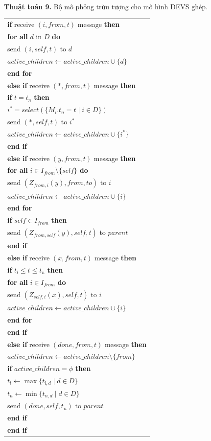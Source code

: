 \noindent\textbf{Thuật toán 9.} Bộ mô phỏng trừu tượng cho mô hình DEVS ghép.
{\small
\begin{longtable}{@{}l@{}}
\textbf{if} receive $(i,from,t)$ message \textbf{then}\\
\quad\textbf{for all} $d$ in $D$ \textbf{do}\\
\qquad send $(i,self,t)$ to $d$\\
\qquad $active\_children\leftarrow active\_children\cup\{d\}$\\
\quad\textbf{end for}\\
\textbf{else if} receive $(*,from,t)$ message \textbf{then}\\
\quad\textbf{if} $t=t_n$ \textbf{then}\\
\qquad $i^*=select(\{M_i.t_n=t\mid i\in D\})$\\
\qquad send $(*,self,t)$ to $i^*$\\
\qquad $active\_children\leftarrow active\_children\cup\{i^*\}$\\
\quad\textbf{end if}\\
\textbf{else if} receive $(y,from,t)$ message \textbf{then}\\
\quad\textbf{for all} $i\in I_{from}\setminus\{self\}$ \textbf{do}\\
\qquad send $(Z_{from,i}(y),from,to)$ to $i$\\
\qquad $active\_children\leftarrow active\_children\cup\{i\}$\\
\quad\textbf{end for}\\
\quad\textbf{if} $self\in I_{from}$ \textbf{then}\\
\qquad send $(Z_{from,self}(y),self,t)$ to $parent$\\
\quad\textbf{end if}\\
\textbf{else if} receive $(x,from,t)$ message \textbf{then}\\
\quad\textbf{if} $t_l\le t\le t_n$ \textbf{then}\\
\qquad\textbf{for all} $i\in I_{from}$ \textbf{do}\\
\qquad\quad send $(Z_{self,i}(x),self,t)$ to $i$\\
\qquad\quad $active\_children\leftarrow active\_children\cup\{i\}$\\
\qquad\textbf{end for}\\
\quad\textbf{end if}\\
\textbf{else if} receive $(done,from,t)$ message \textbf{then}\\
\quad $active\_children\leftarrow active\_children\setminus\{from\}$\\
\quad\textbf{if} $active\_children=\phi$ \textbf{then}\\
\qquad $t_l\leftarrow\max\{t_{l,d}\mid d\in D\}$\\
\qquad $t_n\leftarrow\min\{t_{n,d}\mid d\in D\}$\\
\qquad send $(done,self,t_n)$ to $parent$\\
\quad\textbf{end if}\\
\textbf{end if}
\end{longtable}
}

